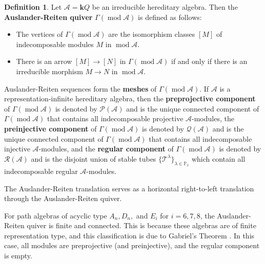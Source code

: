 \documentclass[11pt]{amsart}
\theoremstyle{plain}
\theoremstyle{definition}
\newtheorem{definition}[theorem]{Definition}
\numberwithin{equation}{section}
\renewcommand{\k}{\mathbf{k}}
\renewcommand{\mod}{\operatorname{mod}}
\begin{document}
\begin{definition}
    Let $\mathcal{A} = \k Q$ be an irreducible hereditary algebra. Then the \textbf{Auslander-Reiten quiver} $\Gamma(\mod \mathcal{A} )$ is defined as follows:
    \begin{itemize}
        \item The vertices of $\Gamma( \mod \mathcal{A} )$ are the isomorphism classes $[M]$ of indecomposable modules $M$ in $\mod \mathcal{A}$.
        \item There is an arrow $[M] \to [N]$ in $\Gamma( \mod \mathcal{A} )$ if and only if there is an irreducible morphism $M \to N$ in $\mod \mathcal{A}$.
    \end{itemize}
    Auslander-Reiten sequences form the \textbf{meshes} of $\Gamma(\mod \mathcal{A})$.
    If $\mathcal{A}$ is a representation-infinite hereditary algebra, then the \textbf{preprojective component} of $\Gamma( \mod \mathcal{A} )$ is denoted by $\mathcal{P(A)}$ and is the unique connected component of $\Gamma( \mod \mathcal{A} )$ that contains all indecomposable projective $\mathcal{A}$-modules, the \textbf{preinjective component} of $\Gamma( \mod \mathcal{A} )$ is denoted by $\mathcal{Q(A)}$ and is the unique connected component of $\Gamma( \mod \mathcal{A} )$ that contains all indecomposable injective $\mathcal{A}$-modules, and the \textbf{regular component} of $\Gamma( \mod \mathcal{A} )$ is denoted by $\mathcal{R(A)}$ and is the disjoint union of stable tubes $\{ \mathcal{T}^{\lambda} \}_{\lambda \in \mathbb{P}_1}$ which contain all indecomposable regular $\mathcal{A}$-modules.
\end{definition}

The Auslander-Reiten translation serves as a horizontal right-to-left translation through the Auslander-Reiten quiver.

For path algebras of acyclic type $A_n, D_n,$ and $E_i$ for $i = 6,7,8$, the Auslander-Reiten quiver is finite and connected. 
This is because these algebras are of finite representation type, and this classification is due to Gabriel's Theorem \cite{gabriel_unzerlegbare_1972}.
In this case, all modules are preprojective (and preinjective), and the regular component is empty.
\end{document}
